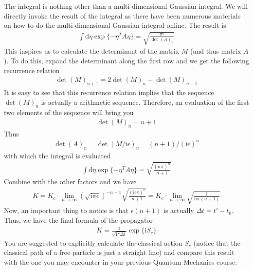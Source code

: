 \documentclass[letterpaper,10pt,english]{sphinxmanual}
\begin{document}
The integral is nothing other than a multi-dimensional Gaussian integral. We will directly invoke the result of the integral as there have been numerous materials on how to do the multi-dimensional Gaussian integral online. The result is
\begin{equation*}
\begin{split}\int \mathrm{d}\eta\exp\{-\eta^T A \eta\} = \sqrt{\frac{\pi^n}{\det(A)_n}}\end{split}
\end{equation*}
This inspires us to calculate the determinant of the matrix \(M\) (and thus matrix \(A\)). To do this, expand the determinant along the first row and we get the following recurrence relation
\begin{equation*}
\begin{split}\det(M)_{n+1} = 2\det(M)_n - \det(M)_{n-1}\end{split}
\end{equation*}
It is easy to see that this recurrence relation implies that the sequence \(\det(M)_n\) is actually a arithmetic sequence. Therefore, an evaluation of the first two elements of the sequence will bring you
\begin{equation*}
\begin{split}\det(M)_n = n+1\end{split}
\end{equation*}
Thus
\begin{equation*}
\begin{split}\det(A)_n = \det(M/\mathrm i\epsilon)_n = (n+1)/(\mathrm i\epsilon)^n\end{split}
\end{equation*}
with which the integral is evaluated
\begin{equation*}
\begin{split}\int \mathrm{d}\eta\exp\{-\eta^T A \eta\} = \sqrt{\frac{(\mathrm i\epsilon\pi)^n}{n+1}}\end{split}
\end{equation*}
Combine with the other factors and we have
\begin{equation*}
\begin{split}K = K_c\cdot\lim_{n\rightarrow\infty}(\sqrt{\mathrm{i}\pi\epsilon})^{-n-1}\sqrt{\frac{(\mathrm i\epsilon\pi)^n}{n+1}} = K_c\cdot\lim_{n\rightarrow\infty}\sqrt{\frac{1}{\mathrm i\pi\epsilon(n+1)}}\end{split}
\end{equation*}
Now, an important thing to notice is that \(\epsilon(n+1)\) is actually \(\Delta t = t'-t_0\). Thus, we have the final formula of the propagator
\begin{equation*}
\begin{split}K = \frac{1}{\sqrt{\mathrm i\pi\Delta t}}\exp\{\mathrm iS_c\}\end{split}
\end{equation*}
You are suggested to explicitly calculate the classical action \(S_c\) (notice that the classical path of a free particle is just a straight line) and compare this result with the one you may encounter in your previous Quantum Mechanics course.
\end{document}

